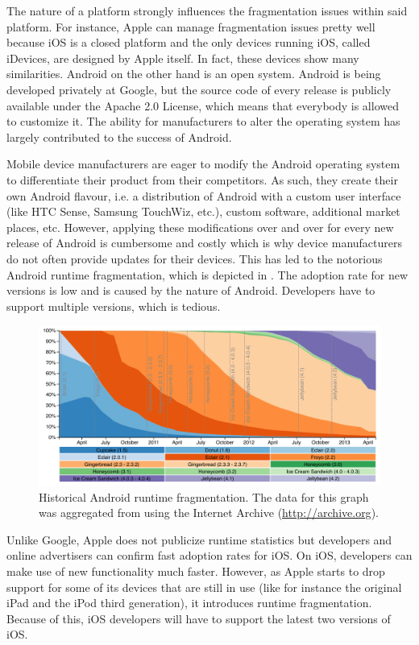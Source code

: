 The nature of a platform strongly influences the fragmentation issues within said platform. For instance, Apple can manage fragmentation issues pretty well because iOS is a closed platform and the only devices running iOS, called iDevices, are designed by Apple itself. In fact, these devices show many similarities. Android on the other hand is an open system. Android is being developed privately at Google, but the source code of every release is publicly available under the Apache 2.0 License, which means that everybody is allowed to customize it. The ability for manufacturers to alter the operating system has largely contributed to the success of Android. 

Mobile device manufacturers are eager to modify the Android operating system to differentiate their product from their competitors. As such, they create their own Android flavour, i.e. a distribution of Android with a custom user interface (like HTC Sense, Samsung TouchWiz, etc.), custom software, additional market places, etc. However, applying these modifications over and over for every new release of Android is cumbersome and costly which is why device manufacturers do not often provide updates for their devices. This has led to the notorious Android runtime fragmentation, which is depicted in . The adoption rate for new versions is low and is caused by the nature of Android. Developers have to support multiple versions, which is tedious. 

\begin{figure}[h]
    \centering
    \includegraphics[width=\textwidth]{../resources/figs/android_runtimes.pdf}
    \caption{Historical Android runtime fragmentation. The data for this graph was aggregated from \cite{Android:Versions} using the Internet Archive (\url{http://archive.org}).}
    \label{fig:android_runtimes}
\end{figure}

Unlike Google, Apple does not publicize runtime statistics but developers \cite{Smith:2013} and online advertisers \cite{Chitika:2013} can confirm fast adoption rates for iOS. On iOS, developers can make use of new functionality much faster. However, as Apple starts to drop support for some of its devices that are still in use (like for instance the original iPad and the iPod third generation), it introduces runtime fragmentation. Because of this, iOS developers will have to support the latest two versions of iOS.

